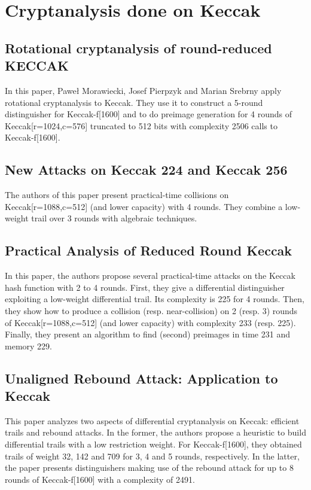 
\section{Cryptanalysis done on Keccak}

\subsection{Rotational cryptanalysis of round-reduced KECCAK} \cite{00022}
In this paper, Paweł Morawiecki, Josef Pierpzyk and Marian Srebrny apply rotational cryptanalysis to Keccak. 
They use it to construct a 5-round distinguisher for Keccak-f[1600] and to do preimage generation for 4 rounds of 
Keccak[r=1024,c=576] truncated to 512 bits with complexity 2506 calls to Keccak-f[1600].

\subsection{New Attacks on Keccak 224 and Keccak 256} \cite{00023}
The authors of this paper present practical-time collisions on Keccak[r=1088,c=512] (and lower capacity) with 4 rounds. 
They combine a low-weight trail over 3 rounds with algebraic techniques.

\subsection{Practical Analysis of Reduced Round Keccak} \cite{00024}
In this paper, the authors propose several practical-time attacks on the Keccak hash function with 2 to 4 rounds. 
First, they give a differential distinguisher exploiting a low-weight differential trail. Its complexity is 225 for 4 
rounds. Then, they show how to produce a collision (resp. near-collision) on 2 (resp. 3) rounds of Keccak[r=1088,c=512] 
(and lower capacity) with complexity 233 (resp. 225). Finally, they present an algorithm to find (second) preimages in 
time 231 and memory 229.

\subsection{Unaligned Rebound Attack: Application to Keccak} \cite{00025}
This paper analyzes two aspects of differential cryptanalysis on Keccak: efficient trails and rebound attacks. In the 
former, the authors propose a heuristic to build differential trails with a low restriction weight. For Keccak-f[1600], 
they obtained trails of weight 32, 142 and 709 for 3, 4 and 5 rounds, respectively. In the latter, the paper presents 
distinguishers making use of the rebound attack for up to 8 rounds of Keccak-f[1600] with a complexity of 2491.


